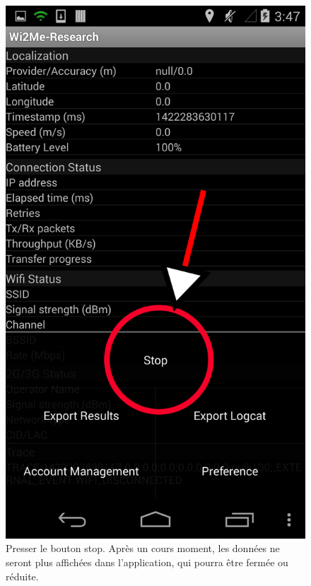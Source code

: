 \documentclass[11pt]{article}
\newcommand\mtext[2]{#1}
\newcommand\mtext[2]{#2}
\begin{document}
\begin{figure}
  \centering
  \caption{\mtext{Presser le bouton stop. Après un cours moment, les données ne seront plus affichées dans l'application, qui pourra être fermée ou réduite.}{Press the stop button. After some processing, the application will stop diplaying data and can be closed or reduced.}}
  \includegraphics[height=0.4\textheight]{stop.png}
\end{figure}
\end{document}
